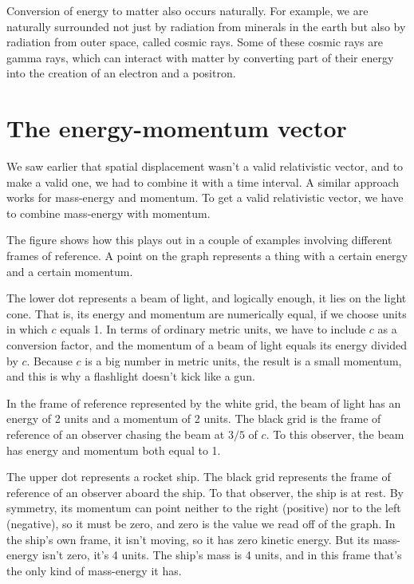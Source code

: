Conversion of energy to matter also occurs naturally. For example, we are naturally surrounded
not just by radiation from minerals in the earth but also by radiation from outer space, called
cosmic rays. Some of these cosmic rays are gamma rays, which can interact with matter by converting
part of their energy into the creation of an electron and a positron.

\section{The energy-momentum vector}

We saw earlier that spatial displacement wasn't a valid relativistic vector, and to make
a valid one, we had to combine it with a time interval. A similar approach works for mass-energy
and momentum. To get a valid relativistic vector, we have to combine mass-energy with momentum.


The figure shows how this plays out in a couple of examples involving different frames of reference.
A point on the graph represents a thing with a certain energy and a certain momentum.

The lower dot
represents a beam of light, and logically enough, it lies on the light cone. That is, its energy
and momentum are numerically equal, if we choose units in which $c$ equals 1. In terms of ordinary
metric units, we have to include $c$ as a conversion factor, and the momentum of a beam of light
equals its energy divided by $c$. Because $c$ is a big number in metric units, the result is a small
momentum, and this is why a flashlight doesn't kick like a gun.

In the frame of reference represented by the white grid, the beam of light has an energy of 2 units and
a momentum of 2 units. The black grid is the frame of reference of an observer chasing the beam at
$3/5$ of $c$. To this observer, the beam has energy and momentum both equal to 1.

The upper dot represents a rocket ship.
The black grid represents the frame of reference of an observer aboard the ship.
To that observer, the ship is at rest. By symmetry, its momentum can point neither to the right (positive)
nor to the left (negative), so it must be zero, and zero is the value we read off of the graph.
In the ship's own frame, it isn't moving, so it has zero kinetic energy. But its mass-energy isn't
zero, it's 4 units. The ship's mass is 4 units, and in this frame that's the only kind of mass-energy it has.

